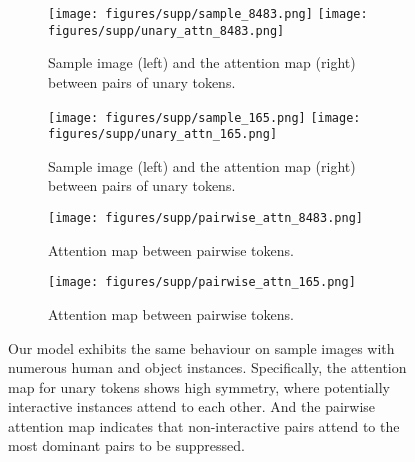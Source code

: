\documentclass[10pt,twocolumn,letterpaper]{article}
\begin{document}
\begin{figure*}
    \begin{subfigure}[t]{.49\linewidth}
        \centering
        \texttt{[image: figures/supp/sample\_8483.png]}
        \texttt{[image: figures/supp/unary\_attn\_8483.png]}
        \caption{Sample image (left) and the attention map (right) between pairs of unary tokens.}
        \label{fig:sample-unary-attn-1}
    \end{subfigure}
    \quad
    \begin{subfigure}[t]{.49\linewidth}
        \centering
        \texttt{[image: figures/supp/sample\_165.png]}
        \texttt{[image: figures/supp/unary\_attn\_165.png]}
        \caption{Sample image (left) and the attention map (right) between pairs of unary tokens.}
        \label{fig:sample-unary-attn-2}
    \end{subfigure}

    \begin{subfigure}[t]{.49\linewidth}
        \centering
        \texttt{[image: figures/supp/pairwise\_attn\_8483.png]}
        \caption{Attention map between pairwise tokens.}
        \label{fig:sample-pairwise-attn-1}
    \end{subfigure}
    \quad
    \begin{subfigure}[t]{.49\linewidth}
        \centering
        \texttt{[image: figures/supp/pairwise\_attn\_165.png]}
        \caption{Attention map between pairwise tokens.}
        \label{fig:sample-pairwise-attn-2}
    \end{subfigure}
    \caption{Our model exhibits the same behaviour on sample images with numerous human and object instances. Specifically, the attention map for unary tokens shows high symmetry, where potentially interactive instances attend to each other. And the pairwise attention map indicates that non-interactive pairs attend to the most dominant pairs to be suppressed.}
    \label{fig:add-attn}
    \vspace{-5pt}
\end{figure*}


\end{document}
